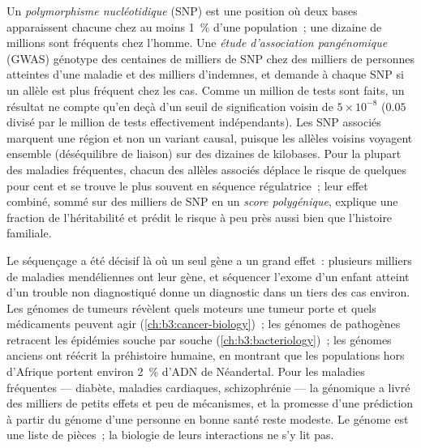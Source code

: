 \begin{definition}\label{def:b3:genomics:gwas}
Un \emph{polymorphisme nucléotidique} (SNP) est une position où deux
bases apparaissent chacune chez au moins \qty{1}{\%} d'une population~;
une dizaine de millions sont fréquents chez l'homme. Une \emph{étude
d'association pangénomique} (GWAS) génotype des centaines de milliers de
SNP chez des milliers de personnes atteintes d'une maladie et des
milliers d'indemnes, et demande à chaque SNP si un allèle est plus
fréquent chez les cas. Comme un million de tests sont faits, un résultat
ne compte qu'en deçà d'un seuil de signification voisin de
$5\times 10^{-8}$ ($0.05$ divisé par le million de tests effectivement
indépendants). Les SNP associés marquent une région et non un variant
causal, puisque les allèles voisins voyagent ensemble (déséquilibre de
liaison) sur des dizaines de kilobases. Pour la plupart des maladies
fréquentes, chacun des allèles associés déplace le risque de quelques
pour cent et se trouve le plus souvent en séquence régulatrice~; leur
effet combiné, sommé sur des milliers de SNP en un \emph{score
polygénique}, explique une fraction de l'héritabilité et prédit le
risque à peu près aussi bien que l'histoire familiale.
\end{definition}

\begin{remark}\label{rem:b3:genomics:delivered}
Le séquençage a été décisif là où un seul gène a un grand effet~:
plusieurs milliers de maladies mendéliennes ont leur gène, et séquencer
l'exome d'un enfant atteint d'un trouble non diagnostiqué donne un
diagnostic dans un tiers des cas environ. Les génomes de tumeurs
révèlent quels moteurs une tumeur porte et quels médicaments peuvent
agir (\cref{ch:b3:cancer-biology})~; les génomes de pathogènes retracent
les épidémies souche par souche (\cref{ch:b3:bacteriology})~; les
génomes anciens ont réécrit la préhistoire humaine, en montrant que les
populations hors d'Afrique portent environ \qty{2}{\%} d'ADN de
Néandertal. Pour les maladies fréquentes --- diabète, maladies
cardiaques, schizophrénie --- la génomique a livré des milliers de
petits effets et peu de mécanismes, et la promesse d'une prédiction à
partir du génome d'une personne en bonne santé reste modeste. Le génome
est une liste de pièces~; la biologie de leurs interactions ne s'y lit
pas.
\end{remark}


